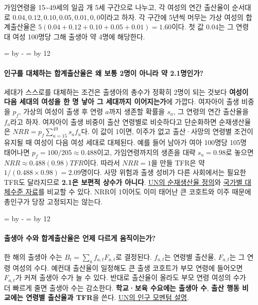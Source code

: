 \documentclass[10pt,a4paper]{article}
\newcommand{\ReserveQuestionSpace}{%
  \par\begingroup
  \dimen0=\pagegoal \advance\dimen0 by -\pagetotal
  \dimen2=\baselineskip \multiply\dimen2 by 12
  \ifdim\dimen0<\dimen2 \newpage\fi
  \endgroup}
\begin{document}
가임연령을 15\textasciitilde{}49세의 일곱 개 5세 구간으로 나누고, 각 여성의 연간 출산율이 순서대로 $0.04, 0.12, 0.10, 0.05, 0.01, 0, 0$이라고 하자. 각 구간에 5년씩 머무는 가상 여성의 합계출산율은 $5(0.04+0.12+0.10+0.05+0.01)=1.60$이다. 첫 값 $0.04$는 그 연령대 여성 100명당 그해 출생아 약 4명에 해당한다.\par

\ReserveQuestionSpace
\paragraph{인구를 대체하는 합계출산율은 왜 보통 2명이 아니라 약 2.1명인가?}
세대가 스스로를 대체하는 조건은 출생아의 총수가 정확히 2명이 되는 것보다 \textbf{여성이 다음 세대의 여성을 한 명 낳아 그 세대까지 이어지는가}에 가깝다. 여자아이 출생 비중을 $p_f$, 가상의 여성이 출생 후 연령 $a$까지 생존할 확률을 $s_a$, 그 연령의 연간 출산율을 $f_a$라고 하자. 여자아이 출생 비중이 출산 연령별로 비슷하다고 단순화하면 순재생산율은 $NRR=p_f\sum_{a=15}^{49}s_af_a$다. 이 값이 1이면, 이주가 없고 출산·사망의 연령별 조건이 유지될 때 여성이 다음 여성 세대로 대체된다. 예를 들어 남아가 여아 100명당 105명 태어나면 $p_f=100/205\approx0.488$이고, 가임연령까지의 생존을 대략 $s_a=0.98$로 놓으면 $NRR\approx0.488(0.98)TFR$이다. 따라서 $NRR=1$을 만들 TFR은 약 $1/(0.488\times0.98)=2.09$명이다. 사망 위험과 출생 성비가 다른 사회에서는 필요한 TFR도 달라지므로 \textbf{2.1은 보편적 상수가 아니다}. \href{https://data.un.org/Glossary.aspx?q=Net+reproduction+rate+\%28surviving+daughters+per+woman\%29}{UN의 순재생산율 정의}와 \href{https://ourworldindata.org/grapher/replacement-fertility-rate}{국가별 대체수준 자료}를 비교할 수 있다. NRR이 1이어도 이미 태어난 큰 코호트와 이주 때문에 총인구가 당장 고정되지는 않는다.\par

\ReserveQuestionSpace
\paragraph{출생아 수와 합계출산율은 언제 다르게 움직이는가?}
한 해의 출생아 수는 $B_t=\sum_a f_{a,t}F_{a,t}$로 결정된다. $f_{a,t}$는 연령별 출산율, $F_{a,t}$는 그 연령 여성의 수다. 예컨대 출산율이 일정해도 큰 출생 코호트가 부모 연령에 들어오면 $F_{a,t}$가 커져 출생아 수가 늘 수 있다. 반대로 출산율이 올라도 부모 연령 여성의 수가 더 빠르게 줄면 출생아 수는 감소한다. \textbf{학교·보육 수요에는 출생아 수}, \textbf{출산 행동 비교에는 연령별 출산율과 TFR}을 쓴다. \href{https://www.unfpa.org/8billion/8trends}{UN의 인구 모멘텀 설명}.\par
\end{document}
